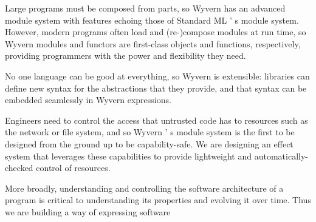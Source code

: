 \documentclass{article}
\begin{document}
\begin{mdUl}[class={ul,list-star,compact},elem={ul},data-line={36}]%
\begin{mdLi}[class={li,ul-li,list-star-li,compact-li},label={[(1)]\{.ul-li-label\}},elem={li},data-line={36}]%
\begin{mdP}[data-line={36}]%
{}Large programs must be composed from parts, so Wyvern has an
advanced module system with features echoing those of Standard
ML%
{}{'}%
{}s module system.  However, modern programs often load and
(re-)compose modules at run time, so Wyvern modules and functors
are first-class objects and functions, respectively, providing
programmers with the power and flexibility they need.%
\end{mdP}%
\end{mdLi}%
\begin{mdLi}[class={li,ul-li,list-star-li,compact-li},label={[(2)]\{.ul-li-label\}},elem={li},data-line={43}]%
\begin{mdP}[data-line={43}]%
{}No one language can be good at everything, so Wyvern is extensible:
libraries can define new syntax for the abstractions that they
provide, and that syntax can be embedded seamlessly in Wyvern
expressions.%
\end{mdP}%
\end{mdLi}%
\begin{mdLi}[class={li,ul-li,list-star-li,compact-li},label={[(3)]\{.ul-li-label\}},elem={li},data-line={48}]%
\begin{mdP}[data-line={48}]%
{}Engineers need to control the access that untrusted code has to
resources such as the network or file system, and so Wyvern%
{}{'}%
{}s module
system is the first to be designed from the ground up to be
capability-safe.  We are designing an effect system that leverages
these capabilities to provide lightweight and automatically-checked
control of resources.%
\end{mdP}%
\end{mdLi}%
\begin{mdLi}[class={li,ul-li,list-star-li,compact-li},label={[(4)]\{.ul-li-label\}},elem={li},data-line={55}]%
\begin{mdP}[data-line={55}]%
{}More broadly, understanding and controlling the software architecture
of a program is critical to understanding its properties and evolving
it over time.  Thus we are building a way of expressing software

\end{mdP}
\end{mdLi}
\end{mdUl}
\end{document}
